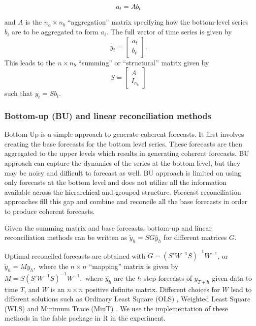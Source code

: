 \documentclass[
  authoryear,
  preprint,
  3p]{elsarticle}
\begin{document}
\[
 a_t = Ab_t
\]

and \(A\) is the \(n_a\times n_b\) ``aggregation'' matrix specifying how
the bottom-level series \(b_t\) are to be aggregated to form \(a_t\).
The full vector of time series is given by \[
 y_t = \begin{bmatrix}a_t \\b_t\end{bmatrix}.
\] This leads to the \(n\times n_b\) ``summing'' or ``structural''
matrix given by \[
  S = \begin{bmatrix}A \\ I_{n_b}\end{bmatrix}
\] such that \(y_t = Sb_t\).

\hypertarget{bottom-up-bu-and-linear-reconciliation-methods}{%
\subsubsection{Bottom-up (BU) and linear reconciliation
methods}\label{bottom-up-bu-and-linear-reconciliation-methods}}

Bottom-Up is a simple approach to generate coherent forecasts. It first
involves creating the base forecasts for the bottom level series. These
forecasts are then aggregated to the upper levels which results in
generating coherent forecasts. BU approach can capture the dynamics of
the series at the bottom level, but they may be noisy and difficult to
forecast as well. BU approach is limited on using only forecasts at the
bottom level and does not utilize all the information available across
the hierarchical and grouped structure. Forecast reconciliation
approaches fill this gap and combine and reconcile all the base
forecasts in order to produce coherent forecasts.

Given the summing matrix and base forecasts, bottom-up and linear
reconciliation methods can be written as \(\tilde{y}_h = SG\hat{y}_h\)
for different matrices \(G\).

Optimal reconciled forecasts are obtained with
\(G=(S'W^{-1}S)^{-1}W^{-1}\), or \(\tilde{y}_h = M\hat{y}_h,\) where the
\(n\times n\) ``mapping'' matrix is given by
\(M = S(S'W^{-1}S)^{-1}W^{-1},\) where \(\hat{y}_h\) are the \(h\)-step
forecasts of \(y_{T+h}\) given data to time \(T\), and \(W\) is an
\(n \times n\) positive definite matrix. Different choices for \(W\)
lead to different solutions such as Ordinary Least Square (OLS) ,
Weighted Least Square (WLS) and Minimum Trace (MinT)
\citep{WicEtAl2019}. We use the implementation of these methods in the
fable package in R in the experiment.
\end{document}
